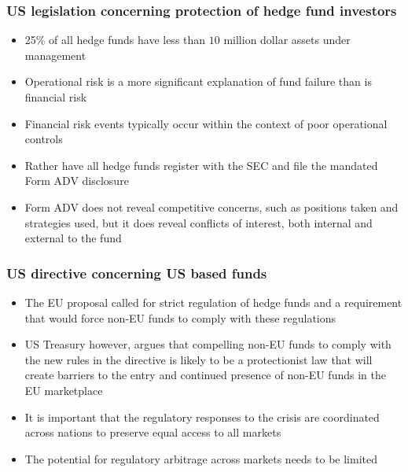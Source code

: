 \documentclass[11pt]{beamer}
\begin{document}
\begin{frame}
\frametitle{US legislation concerning protection of hedge fund investors}
\begin{itemize}
\item 25\% of all hedge funds have less than $10$ million dollar assets under management
\item Operational risk is a more significant explanation of fund failure than is financial risk
\item Financial risk events typically occur within the context of poor operational controls
\item Rather have all hedge funds register with the SEC and file the mandated Form ADV disclosure
\item Form ADV does not reveal competitive concerns, such as positions taken and strategies used, but it does reveal conflicts of interest, both internal and external to the fund
\end{itemize}
\end{frame}

\begin{frame}
\frametitle{US directive concerning US based funds}
\begin{itemize}
\item The EU proposal called for strict regulation of hedge funds and a requirement that would force non-EU funds to comply with these regulations
\item US Treasury however, argues that compelling non-EU funds to comply with the new rules in the directive is likely to be a protectionist law that will create barriers to the entry and continued
presence of non-EU funds in the EU marketplace
\item It is important that the regulatory responses to the crisis are coordinated across nations to preserve equal access to all markets
\item The potential for regulatory arbitrage across markets needs to be
limited
\end{itemize}
\end{frame}
\end{document}
